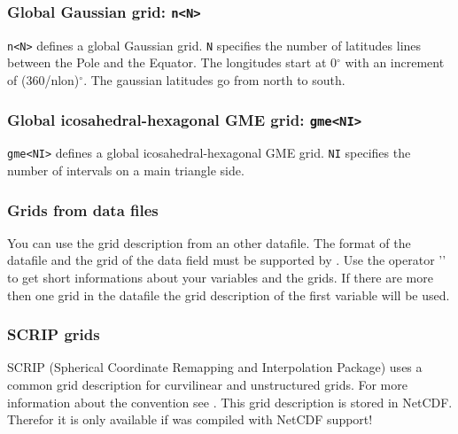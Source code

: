 \subsubsection*{Global Gaussian grid: \texttt{n<N>}}
    \texttt{n<N>} defines a global Gaussian grid. \texttt{N} specifies the number of
    latitudes lines between the Pole and the Equator.
    The longitudes start at 0$^\circ$ with an increment of (360/nlon)$^\circ$.
    The gaussian latitudes go from north to south.


\subsubsection*{Global icosahedral-hexagonal GME grid: \texttt{gme<NI>}}
    \texttt{gme<NI>} defines a global icosahedral-hexagonal GME grid.
    \texttt{NI} specifies the number of intervals on a main triangle side.

\subsubsection{Grids from data files}

You can use the grid description from an other datafile.
The format of the datafile and the grid of the data field must be supported by {\CDO} .
Use the operator '' to get short informations about your variables and the grids.
If there are more then one grid in the datafile the grid description of the first variable will be used.

\subsubsection{SCRIP grids}

SCRIP (Spherical Coordinate Remapping and Interpolation Package) uses
a common grid description for curvilinear and unstructured grids.
For more information about the convention see \cite{SCRIP}.
This grid description is stored in NetCDF. Therefor it is only
available if {\CDO} was compiled with NetCDF support!

\vspace{2mm}

